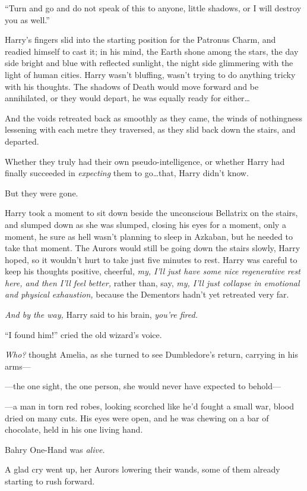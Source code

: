 “Turn and go and do not speak of this to anyone, little shadows, or I will destroy you as well.”

Harry’s fingers slid into the starting position for the Patronus Charm, and readied himself to cast it; in his mind, the Earth shone among the stars, the day side bright and blue with reflected sunlight, the night side glimmering with the light of human cities. Harry wasn’t bluffing, wasn’t trying to do anything tricky with his thoughts. The shadows of Death would move forward and be annihilated, or they would depart, he was equally ready for either…

And the voids retreated back as smoothly as they came, the winds of nothingness lessening with each metre they traversed, as they slid back down the stairs, and departed.

Whether they truly had their own pseudo-intelligence, or whether Harry had finally succeeded in \emph{expecting} them to go…that, Harry didn’t know.

But they were gone.

Harry took a moment to sit down beside the unconscious Bellatrix on the stairs, and slumped down as she was slumped, closing his eyes for a moment, only a moment, he sure as hell wasn’t planning to sleep in Azkaban, but he needed to take that moment. The Aurors would still be going down the stairs slowly, Harry hoped, so it wouldn’t hurt to take just five minutes to rest. Harry was careful to keep his thoughts positive, cheerful, \emph{my, I’ll just have some nice regenerative rest here, and then I’ll feel better,} rather than, say, \emph{my, I’ll just collapse in emotional and physical exhaustion,} because the Dementors hadn’t yet retreated very far.

\emph{And by the way,} Harry said to his brain, \emph{you’re fired.}

\later

“I found him!” cried the old wizard’s voice.

\emph{Who?} thought Amelia, as she turned to see Dumbledore’s return, carrying in his arms—

—the one sight, the one person, she would never have expected to behold—

—a man in torn red robes, looking scorched like he’d fought a small war, blood dried on many cuts. His eyes were open, and he was chewing on a bar of chocolate, held in his one living hand.

Bahry One-Hand was \emph{alive.}

A glad cry went up, her Aurors lowering their wands, some of them already starting to rush forward.

